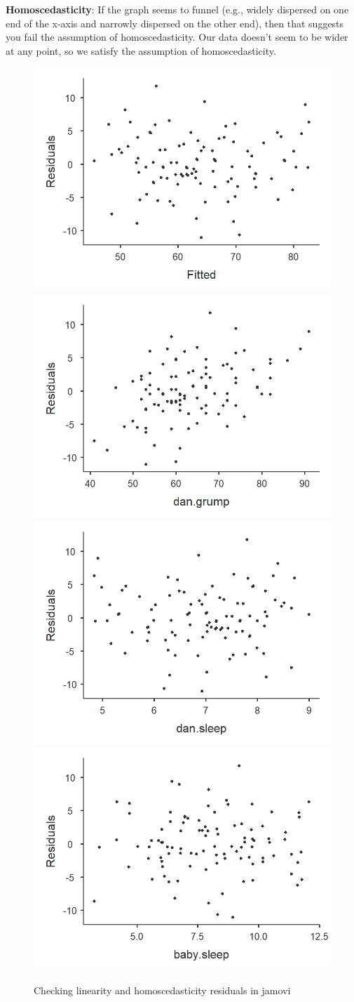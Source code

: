 \documentclass[
]{book}
\begin{document}
\textbf{Homoscedasticity}: If the graph seems to funnel (e.g., widely dispersed on one end of the x-axis and narrowly dispersed on the other end), then that suggests you fail the assumption of homoscedasticity. Our data doesn't seem to be wider at any point, so we satisfy the assumption of homoscedasticity.

\begin{figure}

{\centering \includegraphics[width=0.49\linewidth]{images/13-regression/regression-residuals} \includegraphics[width=0.49\linewidth]{images/13-regression/regression-residuals2} \includegraphics[width=0.49\linewidth]{images/13-regression/regression-residuals3} \includegraphics[width=0.49\linewidth]{images/13-regression/regression-residuals4} 

}

\caption{Checking linearity and homoscedasticity residuals in jamovi}\label{fig:unnamed-chunk-8}
\end{figure}
\end{document}
